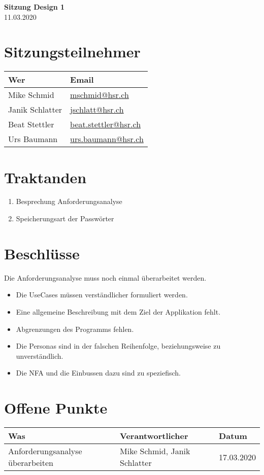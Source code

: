 \documentclass[
	ngerman,
	toc=listof, %
	toc=bibliography, %
	footnotes=multiple, %
	parskip=half, %
	numbers=noendperiod %
]{scrartcl}
\newcommand{\titel}{Sitzung Design 1}
\newcommand{\datum}{11.03.2020}
\begin{document}
\begin{center}
    \LARGE \textbf{\titel} \\[2ex]
    \large \datum \\[2ex]
\end{center}

\section*{Sitzungsteilnehmer}
\begin{tabularx}{0.9\linewidth}{Xl}
	\toprule
	Wer & Email \\
	\midrule
	Mike Schmid & \scriptsize \url{mschmid@hsr.ch} \\
	Janik Schlatter & \scriptsize \url{jschlatt@hsr.ch} \\
	Beat Stettler & \scriptsize \url{beat.stettler@hsr.ch} \\
	Urs Baumann & \scriptsize \url{urs.baumann@hsr.ch} \\
	\bottomrule
\end{tabularx}

\section*{Traktanden}
\begin{enumerate}
	\item Besprechung Anforderungsanalyse
	\item Speicherungsart der Passwörter
\end{enumerate}

\section*{Beschlüsse}
	Die Anforderungsanalyse muss noch einmal überarbeitet werden.
	\begin{itemize}
		\item Die UseCases müssen verständlicher formuliert werden.
		\item Eine allgemeine Beschreibung mit dem Ziel der Applikation fehlt.
		\item Abgrenzungen des Programms fehlen.
		\item Die Personas sind in der falschen Reihenfolge, beziehungsweise zu unverständlich.
		\item Die NFA und die Einbussen dazu sind zu speziefisch.
	\end{itemize}

\section*{Offene Punkte}
\begin{tabularx}{0.9\linewidth}{Xll}
	\toprule
	Was & Verantwortlicher & Datum \\
	\midrule
	 Anforderungsanalyse überarbeiten & Mike Schmid, Janik Schlatter & 17.03.2020 \\
	\bottomrule
\end{tabularx}
\end{document}
